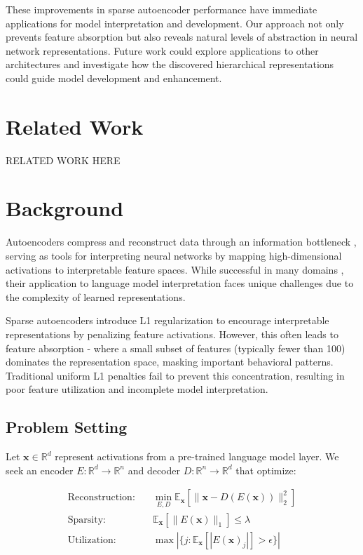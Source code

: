 \documentclass{article} %
\begin{document}
These improvements in sparse autoencoder performance have immediate applications for model interpretation and development. Our approach not only prevents feature absorption but also reveals natural levels of abstraction in neural network representations. Future work could explore applications to other architectures and investigate how the discovered hierarchical representations could guide model development and enhancement.

\section{Related Work}
\label{sec:related}
RELATED WORK HERE

\section{Background}
\label{sec:background}

Autoencoders compress and reconstruct data through an information bottleneck \cite{goodfellow2016deep}, serving as tools for interpreting neural networks by mapping high-dimensional activations to interpretable feature spaces. While successful in many domains \cite{bahdanau2014neural}, their application to language model interpretation faces unique challenges due to the complexity of learned representations.

Sparse autoencoders introduce L1 regularization \cite{kingma2014adam} to encourage interpretable representations by penalizing feature activations. However, this often leads to feature absorption - where a small subset of features (typically fewer than 100) dominates the representation space, masking important behavioral patterns. Traditional uniform L1 penalties fail to prevent this concentration, resulting in poor feature utilization and incomplete model interpretation.

\subsection{Problem Setting}
\label{subsec:problem}
Let $\mathbf{x} \in \mathbb{R}^d$ represent activations from a pre-trained language model layer. We seek an encoder $E: \mathbb{R}^d \rightarrow \mathbb{R}^n$ and decoder $D: \mathbb{R}^n \rightarrow \mathbb{R}^d$ that optimize:

\begin{align*}
    \text{Reconstruction:} & \quad \min_{E,D} \mathbb{E}_{\mathbf{x}}[\|\mathbf{x} - D(E(\mathbf{x}))\|_2^2] \\
    \text{Sparsity:} & \quad \mathbb{E}_{\mathbf{x}}[\|E(\mathbf{x})\|_1] \leq \lambda \\
    \text{Utilization:} & \quad \max|\{j : \mathbb{E}_{\mathbf{x}}[|E(\mathbf{x})_j|] > \epsilon\}|
\end{align*}
\end{document}
